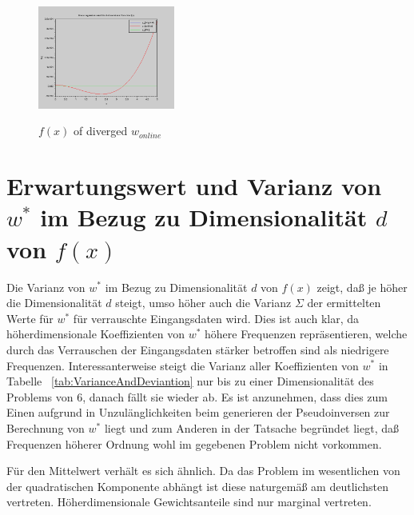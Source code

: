 \documentclass[]{report}
\begin{document}
\begin{figure}[h]
\centering
\includegraphics[width=0.4\textwidth]{./images/f_x_w_online_diverged.png} \\
\caption{ $f(x)$ of diverged $w_{online}$}
\label{fig:WOnlineDiverged}
\end{figure}


\section{Erwartungswert und Varianz von $w^*$ im Bezug zu Dimensionalit\"at $d$ von $f(x)$}

Die Varianz von $w^*$ im Bezug zu Dimensionalit\"at $d$ von $f(x)$ zeigt, da{\ss} je h\"oher die Dimensionalit\"at $d$ steigt, umso h\"oher auch die Varianz $\Sigma$ der ermittelten Werte f\"ur $w^*$ f\"ur verrauschte Eingangsdaten wird. Dies ist auch klar, da h\"oherdimensionale Koeffizienten von $w^*$ h\"ohere Frequenzen repr\"asentieren, welche durch das Verrauschen der Eingangsdaten st\"arker betroffen sind als niedrigere Frequenzen.
Interessanterweise steigt die Varianz aller Koeffizienten von $w^*$ in Tabelle ~\ref{tab:VarianceAndDeviantion} nur bis zu einer Dimensionalit\"at des Problems von $6$, danach f\"allt sie wieder ab. Es ist anzunehmen, dass dies zum Einen aufgrund in Unzul\"anglichkeiten beim generieren der Pseudoinversen zur Berechnung von $w^*$ liegt und zum Anderen in der Tatsache begr\"undet liegt, da{\ss} Frequenzen h\"oherer Ordnung wohl im gegebenen Problem nicht vorkommen.

F\"ur den Mittelwert verh\"alt es sich \"ahnlich. Da das Problem im wesentlichen von der quadratischen Komponente abh\"angt ist diese naturgem\"a{\ss} am deutlichsten vertreten.
H\"oherdimensionale Gewichtsanteile sind nur marginal vertreten.
\end{document}
